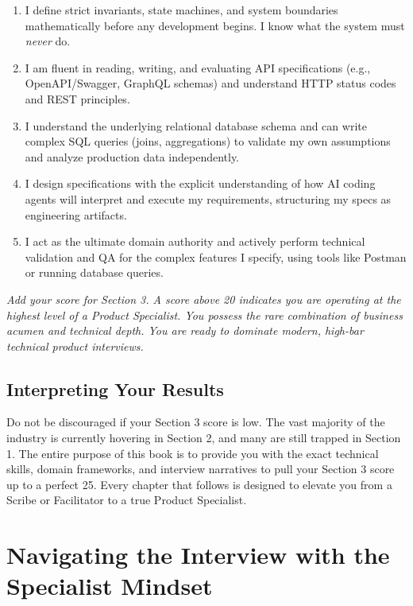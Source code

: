 \documentclass[
  11pt,
  openany,
  oneside]{book}
\providecommand{\tightlist}{%
  \setlength{\itemsep}{0pt}\setlength{\parskip}{0pt}}
\begin{document}
\begin{enumerate}
\def\labelenumi{\arabic{enumi}.}
\tightlist
\item
  I define strict invariants, state machines, and system boundaries
  mathematically before any development begins. I know what the system
  must \emph{never} do.
\item
  I am fluent in reading, writing, and evaluating API specifications
  (e.g., OpenAPI/Swagger, GraphQL schemas) and understand HTTP status
  codes and REST principles.
\item
  I understand the underlying relational database schema and can write
  complex SQL queries (joins, aggregations) to validate my own
  assumptions and analyze production data independently.
\item
  I design specifications with the explicit understanding of how AI
  coding agents will interpret and execute my requirements, structuring
  my specs as engineering artifacts.
\item
  I act as the ultimate domain authority and actively perform technical
  validation and QA for the complex features I specify, using tools like
  Postman or running database queries.
\end{enumerate}

\emph{Add your score for Section 3. A score above 20 indicates you are
operating at the highest level of a Product Specialist. You possess the
rare combination of business acumen and technical depth. You are ready
to dominate modern, high-bar technical product interviews.}

\subsection{Interpreting Your Results}\label{interpreting-your-results}

Do not be discouraged if your Section 3 score is low. The vast majority
of the industry is currently hovering in Section 2, and many are still
trapped in Section 1. The entire purpose of this book is to provide you
with the exact technical skills, domain frameworks, and interview
narratives to pull your Section 3 score up to a perfect 25. Every
chapter that follows is designed to elevate you from a Scribe or
Facilitator to a true Product Specialist.

\section{Navigating the Interview with the Specialist
Mindset}\label{navigating-the-interview-with-the-specialist-mindset}
\end{document}
